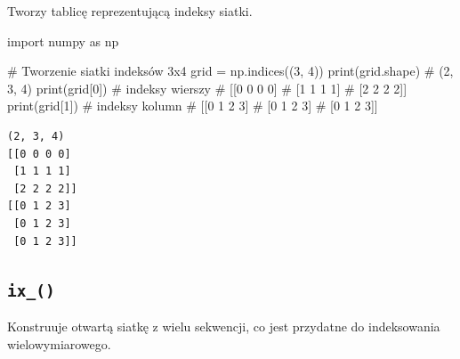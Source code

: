 \documentclass[
  letterpaper,
  DIV=11,
  numbers=noendperiod]{scrreprt}
\newenvironment{Shaded}{\begin{snugshade}}{\end{snugshade}}
\newcommand{\BuiltInTok}[1]{\textcolor[rgb]{0.00,0.23,0.31}{#1}}
\newcommand{\CommentTok}[1]{\textcolor[rgb]{0.37,0.37,0.37}{#1}}
\newcommand{\DecValTok}[1]{\textcolor[rgb]{0.68,0.00,0.00}{#1}}
\newcommand{\ImportTok}[1]{\textcolor[rgb]{0.00,0.46,0.62}{#1}}
\newcommand{\NormalTok}[1]{\textcolor[rgb]{0.00,0.23,0.31}{#1}}
\newcommand{\OperatorTok}[1]{\textcolor[rgb]{0.37,0.37,0.37}{#1}}
\begin{document}
Tworzy tablicę reprezentującą indeksy siatki.

\begin{Shaded}
\begin{Highlighting}[]
\ImportTok{import}\NormalTok{ numpy }\ImportTok{as}\NormalTok{ np}

\CommentTok{\# Tworzenie siatki indeksów 3x4}
\NormalTok{grid }\OperatorTok{=}\NormalTok{ np.indices((}\DecValTok{3}\NormalTok{, }\DecValTok{4}\NormalTok{))}
\BuiltInTok{print}\NormalTok{(grid.shape)  }\CommentTok{\# (2, 3, 4)}
\BuiltInTok{print}\NormalTok{(grid[}\DecValTok{0}\NormalTok{])  }\CommentTok{\# indeksy wierszy}
\CommentTok{\# [[0 0 0 0]}
\CommentTok{\#  [1 1 1 1]}
\CommentTok{\#  [2 2 2 2]]}
\BuiltInTok{print}\NormalTok{(grid[}\DecValTok{1}\NormalTok{])  }\CommentTok{\# indeksy kolumn}
\CommentTok{\# [[0 1 2 3]}
\CommentTok{\#  [0 1 2 3]}
\CommentTok{\#  [0 1 2 3]]}
\end{Highlighting}
\end{Shaded}

\begin{verbatim}
(2, 3, 4)
[[0 0 0 0]
 [1 1 1 1]
 [2 2 2 2]]
[[0 1 2 3]
 [0 1 2 3]
 [0 1 2 3]]
\end{verbatim}

\subsection{\texorpdfstring{\texttt{ix\_()}}{ix\_()}}\label{ix_}

Konstruuje otwartą siatkę z wielu sekwencji, co jest przydatne do
indeksowania wielowymiarowego.
\end{document}
